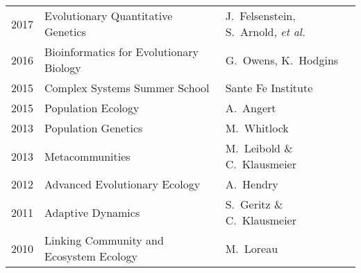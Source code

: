\documentclass[12pt]{article}
\begin{document}
%

\begin{tabular}{lll}
2017 & Evolutionary Quantitative Genetics & J.\ Felsenstein, S.\ Arnold, \textit{et al.}\\
2016 & Bioinformatics for Evolutionary Biology & G.\ Owens, K.\ Hodgins\\
2015 & Complex Systems Summer School & Sante Fe Institute\\
2015 & Population Ecology & A.\ Angert\\
2013 & Population Genetics & M.\ Whitlock\\
2013 & Metacommunities & M.\ Leibold \& C.\ Klausmeier\\
2012 & Advanced Evolutionary Ecology & A.\ Hendry\\
2011 & Adaptive Dynamics & S.\ Geritz \& C.\ Klausmeier\\
2010 & Linking Community and Ecosystem Ecology & M.\ Loreau\\
\end{tabular}
\end{document}

